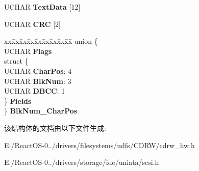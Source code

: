 \begin{DoxyCompactItemize}
\begin{tabbing}
\end{tabbing}\item 
\mbox{\label{struct___c_d___t_e_x_t___p_a_c_k___d_a_t_a_a761ebae408b4319bb4204047c6474d9d}} 
U\+C\+H\+AR {\bfseries Text\+Data} \mbox{[}12\mbox{]}
\item 
\mbox{\label{struct___c_d___t_e_x_t___p_a_c_k___d_a_t_a_a8d8f17cad7e2d28c6d61caa7559a3481}} 
U\+C\+H\+AR {\bfseries C\+RC} \mbox{[}2\mbox{]}
\item 
\mbox{\label{struct___c_d___t_e_x_t___p_a_c_k___d_a_t_a_afa00b47870111e4543a9cacb95110554}} 
\begin{tabbing}
xx\=xx\=xx\=xx\=xx\=xx\=xx\=xx\=xx\=\kill
union \{\\
\>UCHAR {\bfseries Flags}\\
\>struct \{\\
\>\>UCHAR {\bfseries CharPos}: 4\\
\>\>UCHAR {\bfseries BlkNum}: 3\\
\>\>UCHAR {\bfseries DBCC}: 1\\
\>\} {\bfseries Fields}\\
\} {\bfseries BlkNum\_CharPos}\\

\end{tabbing}\end{DoxyCompactItemize}


该结构体的文档由以下文件生成\+:\begin{DoxyCompactItemize}
\item 
E\+:/\+React\+O\+S-\/0../drivers/filesystems/udfs/\+C\+D\+R\+W/cdrw\+\_\+hw.\+h\item 
E\+:/\+React\+O\+S-\/0../drivers/storage/ide/uniata/scsi.\+h\end{DoxyCompactItemize}

